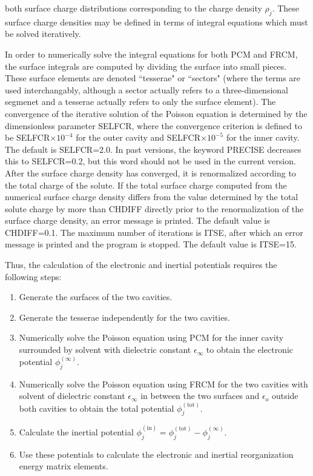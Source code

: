 \documentclass[oneside,11pt,openany]{book}
\begin{document}
both surface charge distributions corresponding
to the charge density $\rho_j$.
These surface charge densities may be defined
in terms of integral equations which must
be solved iteratively.  
\par
In order to numerically solve
the integral equations for both PCM and FRCM, the
surface integrals are computed
by dividing the surface into small pieces.  
These surface
elements are denoted ``tesserae" or  ``sectors" (where the terms
are used interchangably, although a
sector actually refers to a three-dimensional segmenet
and a tesserae actually refers to only the surface element).
The convergence of the iterative solution of the Poisson equation is
determined by the dimensionless parameter SELFCR, where
the convergence criterion is defined to be SELFCR$\times 10^{-4}$
for the outer cavity and SELFCR$\times 10^{-5}$ for the inner cavity.
The default is SELFCR=2.0.  In past versions, the keyword PRECISE 
decreases this to SELFCR=0.2, but
this word should not be used in the current version.
After the surface charge density has converged, it is
renormalized according to the total charge of the solute.
If the total surface charge computed from the
numerical surface charge density differs from the value
determined by the total solute charge
by more than CHDIFF directly prior to the renormalization
of the surface charge density, an error message
is printed.  The default value
is CHDIFF=0.1.
The maximum number of iterations is ITSE, after which an
error message is printed and the program is stopped.
The default value is ITSE=15.
\par
Thus, the calculation of the electronic and inertial
potentials requires the following steps:
\begin{enumerate}
\item{Generate the surfaces of the two cavities.}
\item{Generate the tesserae independently for the two cavities.}
\item{Numerically solve the Poisson equation using PCM for the inner
cavity surrounded by solvent with dielectric constant $\epsilon_\infty$
to obtain the electronic potential $\phi_j^{(\infty)}$.}
\item{Numerically solve the Poisson equation using FRCM for the two cavities
with solvent of dielectric constant $\epsilon_\infty$ in between
the two surfaces and $\epsilon_o$ outside both cavities
to obtain the total potential $\phi_j^{\mathrm{(tot)}}$.}
\item{Calculate the inertial
potential $\phi_j^{\mathrm{(in)}}=\phi_j^{\mathrm{(tot)}}
- \phi_j^{(\infty)}$.}
\item{Use these potentials to calculate the electronic
and inertial reorganization energy matrix elements.}
\end{enumerate}
%
\end{document}
